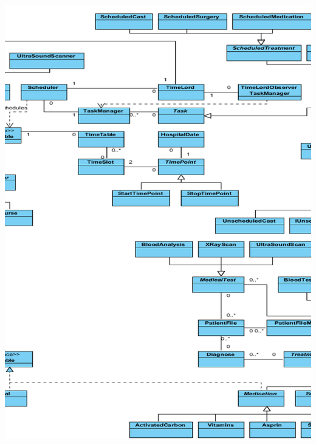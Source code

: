 \documentclass[11pt]{article}
\begin{document}
\includegraphics[width=170mm]{left2.png}\\
\end{document}
